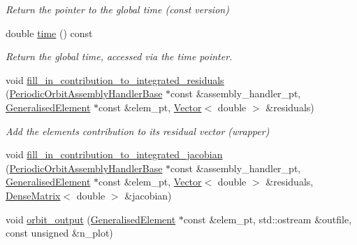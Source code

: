 \begin{DoxyCompactItemize}
\begin{DoxyCompactList}\small\item\em Return the pointer to the global time (const version) \end{DoxyCompactList}\item 
double \hyperlink{classoomph_1_1PeriodicOrbitEquations_a75baee083d554768bd75135196ab26c5}{time} () const
\begin{DoxyCompactList}\small\item\em Return the global time, accessed via the time pointer. \end{DoxyCompactList}\item 
void \hyperlink{classoomph_1_1PeriodicOrbitEquations_a3b1aca3d26cf545636199b830a375b04}{fill\+\_\+in\+\_\+contribution\+\_\+to\+\_\+integrated\+\_\+residuals} (\hyperlink{classoomph_1_1PeriodicOrbitAssemblyHandlerBase}{Periodic\+Orbit\+Assembly\+Handler\+Base} $\ast$const \&assembly\+\_\+handler\+\_\+pt, \hyperlink{classoomph_1_1GeneralisedElement}{Generalised\+Element} $\ast$const \&elem\+\_\+pt, \hyperlink{classoomph_1_1Vector}{Vector}$<$ double $>$ \&residuals)
\begin{DoxyCompactList}\small\item\em Add the element\textquotesingle{}s contribution to its residual vector (wrapper) \end{DoxyCompactList}\item 
void \hyperlink{classoomph_1_1PeriodicOrbitEquations_a1b818facd1cf315a97176daaa4bc4ee2}{fill\+\_\+in\+\_\+contribution\+\_\+to\+\_\+integrated\+\_\+jacobian} (\hyperlink{classoomph_1_1PeriodicOrbitAssemblyHandlerBase}{Periodic\+Orbit\+Assembly\+Handler\+Base} $\ast$const \&assembly\+\_\+handler\+\_\+pt, \hyperlink{classoomph_1_1GeneralisedElement}{Generalised\+Element} $\ast$const \&elem\+\_\+pt, \hyperlink{classoomph_1_1Vector}{Vector}$<$ double $>$ \&residuals, \hyperlink{classoomph_1_1DenseMatrix}{Dense\+Matrix}$<$ double $>$ \&jacobian)
\item 
void \hyperlink{classoomph_1_1PeriodicOrbitEquations_a117883e07ed35569cd396deb2c5bba97}{orbit\+\_\+output} (\hyperlink{classoomph_1_1GeneralisedElement}{Generalised\+Element} $\ast$const \&elem\+\_\+pt, std\+::ostream \&outfile, const unsigned \&n\+\_\+plot)
\end{DoxyCompactItemize}
